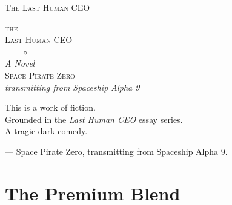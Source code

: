 \documentclass[11pt,openany]{book}
\begin{document}
\frontmatter

\thispagestyle{empty}\vspace*{3in}
\begin{center}{\large\textsc{The Last Human CEO}}\end{center}\clearpage
\thispagestyle{empty}\mbox{}\clearpage

\thispagestyle{empty}\begin{center}\vspace*{1.8in}
{\small\textsc{the}}\\[0.12in]
{\Huge\textsc{Last Human CEO}}\\[0.45in]
{\small------\quad$\diamond$\quad------}\\[0.4in]
{\large\textit{A Novel}}\\[1.0in]
{\Large\textsc{Space Pirate Zero}}\\[0.3in]
{\footnotesize\textit{transmitting from Spaceship Alpha 9}}\\[1.2in]
\end{center}\clearpage

\thispagestyle{empty}\vspace*{\fill}\begin{center}
{\small This is a work of fiction.}\\[4pt]
{\small Grounded in the \textit{Last Human CEO} essay series.}\\[10pt]
{\small A tragic dark comedy.}
\end{center}\vspace*{\fill}\clearpage

\thispagestyle{empty}
\vspace*{1.6in}
\begin{center}\begin{minipage}{3.4in}
\itshape\small\setlength{\parindent}{0pt}
\par\vspace{0.8em}\hfill \textrm{\footnotesize --- Space Pirate Zero, transmitting from Spaceship Alpha 9.}
\end{minipage}\end{center}
\clearpage

\mainmatter

\clearpage
\chapter{The Premium Blend}
\end{document}
